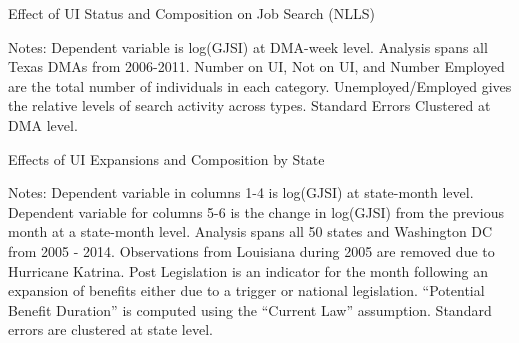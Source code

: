 \documentclass[12pt]{article}
\begin{document}
\begin{spacing}{2}
\begin{table}
\caption{Effect of UI Status and Composition on Job Search (NLLS)}\label{tab:nllscurlaw}
\begin{center}

\begin{tablenotes}
\item  Notes: Dependent variable is log(GJSI) at DMA-week level. Analysis spans all Texas DMAs from 2006-2011. Number on UI, Not on UI, and Number Employed are the total number of individuals in each category. Unemployed/Employed gives the relative levels of search activity across types. Standard Errors Clustered at DMA level.
\end{tablenotes}
\end{center}
\end{table}

\begin{sidewaystable}
\caption{Effects of UI Expansions and Composition by State \label{tab:nationalregs}}
\begin{center}

\begin{tablenotes}
\item  Notes: Dependent variable in columns 1-4 is log(GJSI) at state-month level. Dependent variable for columns 5-6 is the change in log(GJSI) from the previous month at a state-month level. Analysis spans all 50 states and Washington DC from 2005 - 2014. Observations from Louisiana during 2005 are removed due to Hurricane Katrina. Post Legislation is an indicator for the month following an expansion of benefits either due to a trigger or national legislation. ``Potential Benefit Duration'' is computed using the ``Current Law'' assumption. Standard errors are clustered at state level.
\end{tablenotes}
\end{center}
\end{sidewaystable}


\end{spacing}
\end{document}
